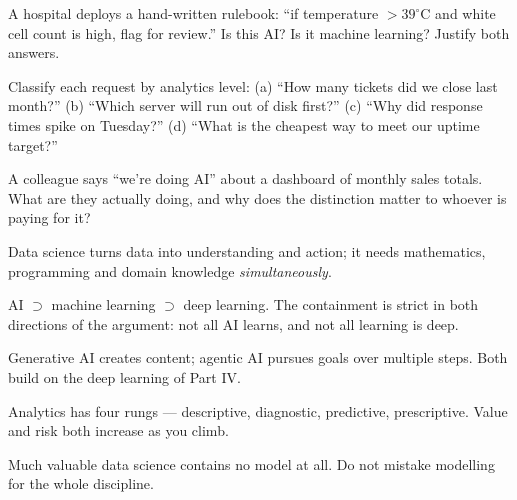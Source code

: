 \begin{checkpoint}
\begin{tightnum}
  \item A hospital deploys a hand-written rulebook: ``if temperature $>39^\circ$C
        and white cell count is high, flag for review.'' Is this AI? Is it machine
        learning? Justify both answers.
  \item Classify each request by analytics level: (a) ``How many tickets did we
        close last month?'' (b) ``Which server will run out of disk first?''
        (c) ``Why did response times spike on Tuesday?'' (d) ``What is the
        cheapest way to meet our uptime target?''
  \item A colleague says ``we're doing AI'' about a dashboard of monthly sales
        totals. What are they actually doing, and why does the distinction matter
        to whoever is paying for it?
\end{tightnum}
\end{checkpoint}

\begin{chaptersummary}
\begin{tight}
  \item Data science turns data into understanding and action; it needs
        mathematics, programming and domain knowledge \emph{simultaneously}.
  \item AI $\supset$ machine learning $\supset$ deep learning. The containment is
        strict in both directions of the argument: not all AI learns, and not all
        learning is deep.
  \item Generative AI creates content; agentic AI pursues goals over multiple
        steps. Both build on the deep learning of Part IV.
  \item Analytics has four rungs --- descriptive, diagnostic, predictive,
        prescriptive. Value and risk both increase as you climb.
  \item Much valuable data science contains no model at all. Do not mistake
        modelling for the whole discipline.
\end{tight}
\end{chaptersummary}

